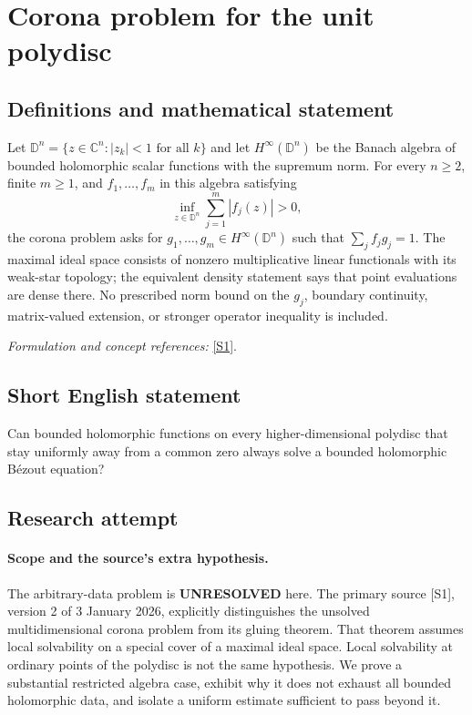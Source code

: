 \documentclass[11pt]{article}
\begin{document}
\section*{\texorpdfstring{Corona problem for the unit polydisc}{Corona problem for the unit polydisc}}\label{statement}
\subsection{Definitions and mathematical statement}
Let $\mathbb D^n=\{z\in{\mathbb{C}}^n:|z_k|<1\text{ for all }k\}$ and let $H^\infty(\mathbb D^n)$ be the Banach algebra of bounded holomorphic scalar functions with the supremum norm. For every $n\ge2$, finite $m\ge1$, and $f_1,\ldots,f_m$ in this algebra satisfying
\[
 \inf_{z\in\mathbb D^n}\sum_{j=1}^m|f_j(z)|>0,
\]
the corona problem asks for $g_1,\ldots,g_m\in H^\infty(\mathbb D^n)$ such that $\sum_jf_jg_j=1$. The maximal ideal space consists of nonzero multiplicative linear functionals with its weak-star topology; the equivalent density statement says that point evaluations are dense there. No prescribed norm bound on the $g_j$, boundary continuity, matrix-valued extension, or stronger operator inequality is included.
\par\smallskip\textit{Formulation and concept references:} \href{https://arxiv.org/pdf/2512.23733v2}{[S1]}.

\subsection{Short English statement}
Can bounded holomorphic functions on every higher-dimensional polydisc that stay uniformly away from a common zero always solve a bounded holomorphic B\'ezout equation?
\subsection{Research attempt}
\paragraph{Scope and the source's extra hypothesis.}
The arbitrary-data problem is \textbf{UNRESOLVED} here. The primary
source [S1], version 2 of 3 January 2026, explicitly distinguishes
the unsolved multidimensional corona problem from its gluing theorem.
That theorem assumes local solvability on a special cover of a maximal
ideal space. Local solvability at ordinary points of the polydisc is
not the same hypothesis. We prove a substantial restricted algebra
case, exhibit why it does not exhaust all bounded holomorphic data,
and isolate a uniform estimate sufficient to pass beyond it.
\end{document}
